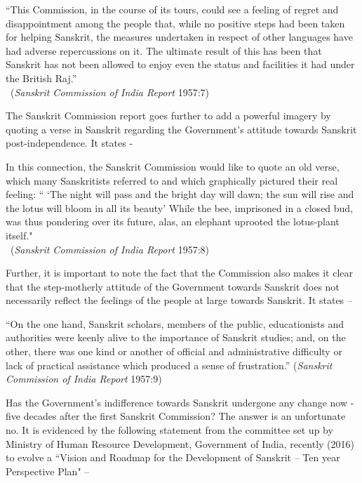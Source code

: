 \begin{myquote}
\eleven
“This Commission, in the course of its tours, could see a feeling of regret and disappointment among the people that, while no positive steps had been taken for helping Sanskrit, the measures undertaken in respect of other languages have had adverse repercussions on it. The ultimate result of this has been that Sanskrit has not been allowed to enjoy even the status and facilities it had under the British Raj.”\\[-15pt] 

~\hfill({\sl Sanskrit Commission of India Report} 1957:7)
\end{myquote}

The Sanskrit Commission report goes further to add a powerful imagery by quoting a verse in Sanskrit regarding the Government’s attitude towards Sanskrit post-independence. It states -
\begin{myquote}
\eleven
In this connection, the Sanskrit Commission would like to quote an old verse, which many Sanskritists referred to and which graphically pictured their real feeling: `` `The night will pass and the bright day will dawn; the sun will rise and the lotus will bloom in all its beauty' While the bee, imprisoned in a closed bud, was thus pondering over its future, alas, an elephant uprooted the lotus-plant itself."\\[-15pt]   

~\hfill({\sl Sanskrit Commission of India Report} 1957:8)
\end{myquote}

Further, it is important to note the fact that the Commission also makes it clear that the step-motherly attitude of the Government towards Sanskrit does not necessarily reflect the feelings of the people at large towards Sanskrit.  It states – 

\begin{myquote}
\eleven
“On the one hand, Sanskrit scholars, members of the public, educationists and authorities were keenly alive to the importance of Sanskrit studies; and, on the other, there was one kind or another of official and administrative difficulty or lack of practical assistance which produced a sense of frustration.” \hfill({\sl Sanskrit Commission of India Report} 1957:9)
\end{myquote}

Has the Government’s indifference towards Sanskrit undergone any change now - five decades after the first Sanskrit Commission? The answer is an unfortunate no. It is evidenced by the following statement from the committee set up by Ministry of Human Resource Development, Government of India, recently (2016) to evolve a “Vision and Roadmap for the Development of Sanskrit – Ten year Perspective Plan" – 

